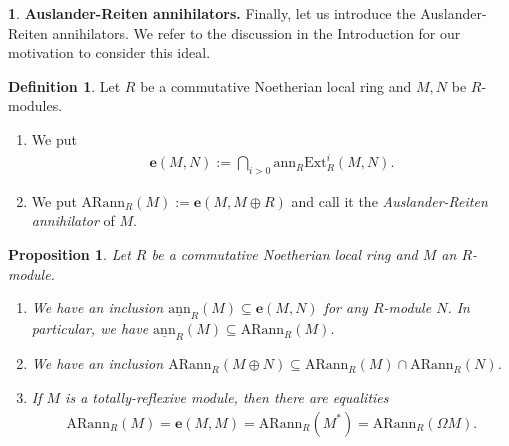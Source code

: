 \documentclass[12pt]{amsart}
\newcommand{\Ext}{\mathrm{Ext}}
\newcommand{\ann}{\mathrm{ann}}
\newcommand{\sann}{\underline{\mathrm{ann}}}
\newcommand{\arann}{\mathrm{ARann}}
\newtheorem{proposition}[theorem]{Proposition}
\theoremstyle{definition}
\newtheorem{definition}[theorem]{Definition}
\newtheorem{chunk}[theorem]{}
\numberwithin{equation}{theorem}
\def\e{\boldsymbol{e}}
\begin{document}
\begin{chunk}
    \textbf{Auslander-Reiten annihilators.} Finally, let us introduce the Auslander-Reiten annihilators. We refer to the discussion in the Introduction for our motivation to consider this ideal.
    \begin{definition}\label{Auslander-Reiten-annihilator-definitions}
        Let $R$ be a commutative Noetherian local ring and $M, N$ be  $R$-modules.
            \begin{enumerate}
                \item We put 
                \begin{align*}
                \e(M,N) := \bigcap_{i > 0} \ann_R \Ext_R^i(M,N).
                \end{align*}
                \item We put $\arann_R(M) := \e(M,M \oplus R)$ and call it the \textit{Auslander-Reiten annihilator} of $M$.
            \end{enumerate}
    \end{definition}
    \begin{proposition}\label{first-proposition-for-auslander-reiten-annihilators}
        Let $R$ be a commutative Noetherian local ring and $M$ an $R$-module.
        \begin{enumerate}
            \item We have an inclusion $\sann_R(M) \subseteq \e(M,N)$ for any $R$-module $N$. In particular, we have $\sann_R(M) \subseteq \arann_R(M)$.
            \item We have an inclusion $\arann_R(M \oplus N) \subseteq \arann_R(M) \cap \arann_R(N)$.
            \item If $M$ is a totally-reflexive module, then there are equalities 
            \begin{align*}
                \arann_R(M) = \e(M,M) = \arann_R(M^*) = \arann_R(\Omega M).
            \end{align*}
            

\end{enumerate}
\end{proposition}
\end{chunk}
\end{document}
